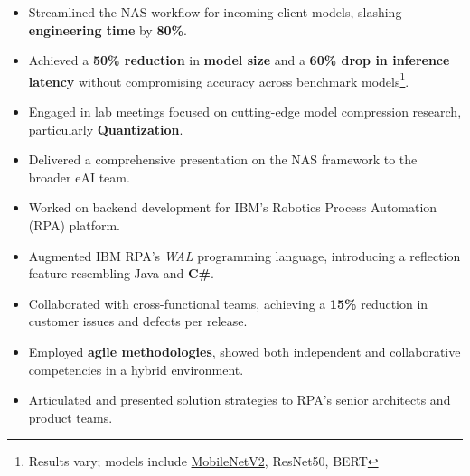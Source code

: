 \documentclass[10pt,a4paper,ragged2e,withhyper]{altacv}
\begin{document}
\begin{paracol}{2}
\begin{itemize}
        \item Streamlined the NAS workflow for incoming client models, slashing
              \textbf{engineering time} by \textbf{80\%}.

        \item Achieved a \textbf{50\% reduction} in \textbf{model size} and a
              \textbf{60\% drop in inference latency} without compromising accuracy across benchmark models\footnote*{Results vary; models include \href{https://arxiv.org/abs/1801.04381}{MobileNetV2}, ResNet50, BERT}.

        \item Engaged in lab meetings focused on cutting-edge model compression
              research, particularly \textbf{Quantization}.

        \item Delivered a comprehensive presentation on the NAS framework to the
              broader eAI team.

    \end{itemize}

    \divider{}


    \begin{itemize}

        \item Worked on backend development for IBM's Robotics Process Automation (RPA) platform.

        \item Augmented IBM RPA's \textit{WAL} programming
              language, introducing a reflection feature resembling Java and \textbf{C\#}.

        \item Collaborated with cross-functional teams, achieving a \textbf{15\%} reduction in customer issues and defects per release.

        \item Employed \textbf{agile methodologies}, showed both independent and
              collaborative competencies in a hybrid environment.

        \item Articulated and presented solution strategies to RPA's senior architects and product teams.



\end{itemize}
\end{paracol}
\end{document}
